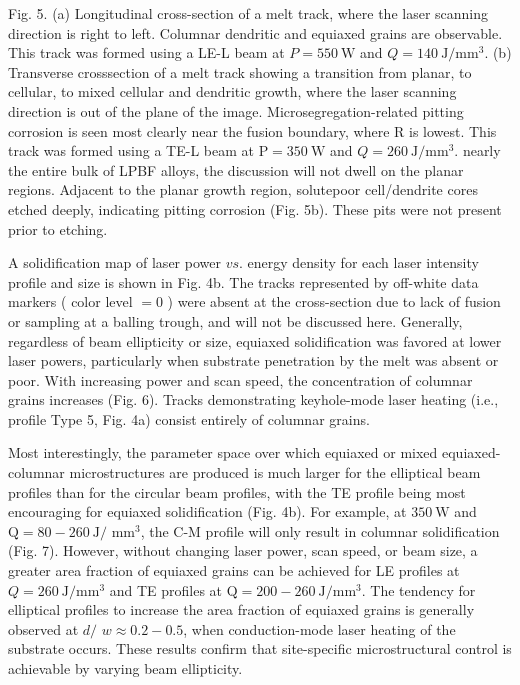\documentclass[10pt]{article}
\begin{document}
Fig. 5. (a) Longitudinal cross-section of a melt track, where the laser scanning direction is right to left. Columnar dendritic and equiaxed grains are observable. This track was formed using a LE-L beam at $P=550 \mathrm{~W}$ and $Q=140 \mathrm{~J} / \mathrm{mm}^{3}$. (b) Transverse crosssection of a melt track showing a transition from planar, to cellular, to mixed cellular and dendritic growth, where the laser scanning direction is out of the plane of the image. Microsegregation-related pitting corrosion is seen most clearly near the fusion boundary, where $\mathrm{R}$ is lowest. This track was formed using a TE-L beam at $\mathrm{P}=350 \mathrm{~W}$ and $Q=260 \mathrm{~J} / \mathrm{mm}^{3}$. nearly the entire bulk of LPBF alloys, the discussion will not dwell on the planar regions. Adjacent to the planar growth region, solutepoor cell/dendrite cores etched deeply, indicating pitting corrosion (Fig. 5b). These pits were not present prior to etching.

A solidification map of laser power $v s$. energy density for each laser intensity profile and size is shown in Fig. 4b. The tracks represented by off-white data markers ( color level $=0$ ) were absent at the cross-section due to lack of fusion or sampling at a balling trough, and will not be discussed here. Generally, regardless of beam ellipticity or size, equiaxed solidification was favored at lower laser powers, particularly when substrate penetration by the melt was absent or poor. With increasing power and scan speed, the concentration of columnar grains increases (Fig. 6). Tracks demonstrating keyhole-mode laser heating (i.e., profile Type 5, Fig. 4a) consist entirely of columnar grains.

Most interestingly, the parameter space over which equiaxed or mixed equiaxed-columnar microstructures are produced is much larger for the elliptical beam profiles than for the circular beam profiles, with the TE profile being most encouraging for equiaxed solidification (Fig. 4b). For example, at $350 \mathrm{~W}$ and $\mathrm{Q}=80-260 \mathrm{~J} /$ $\mathrm{mm}^{3}$, the C-M profile will only result in columnar solidification (Fig. 7). However, without changing laser power, scan speed, or beam size, a greater area fraction of equiaxed grains can be achieved for LE profiles at $Q=260 \mathrm{~J} / \mathrm{mm}^{3}$ and TE profiles at $\mathrm{Q}=200-260 \mathrm{~J} / \mathrm{mm}^{3}$. The tendency for elliptical profiles to increase the area fraction of equiaxed grains is generally observed at $d /$ $w \approx 0.2-0.5$, when conduction-mode laser heating of the substrate occurs. These results confirm that site-specific microstructural control is achievable by varying beam ellipticity.
\end{document}
